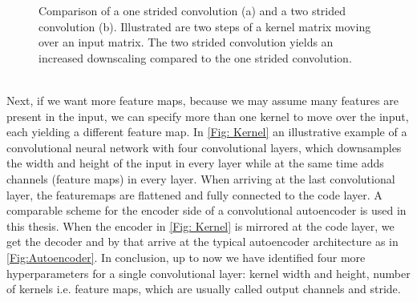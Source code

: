 \begin{figure}[htbp!]
	\begin{subfigure}{.459\textwidth}
		\centering
		
	\end{subfigure}\hfill
	\begin{subfigure}{.441\textwidth}
		\centering
		
	\end{subfigure}
	\caption{Comparison of a one strided convolution (a) and a two strided convolution (b). Illustrated are two steps of a kernel matrix moving over an input matrix. The two strided convolution yields an increased downscaling compared to the one strided convolution.}
	\label{Fig: Downsampling}
\end{figure}
\\Next, if we want more feature maps, because we may assume many features are present in the input, we can specify more than one kernel to move over the input, each yielding a different feature map. In \cref{Fig: Kernel} an illustrative example of a convolutional neural network with four convolutional layers, which downsamples the width and height of the input in every layer while at the same time adds channels (feature maps) in every layer. When arriving at the last convolutional layer, the featuremaps are flattened and fully connected to the code layer. A comparable scheme for the encoder side of a convolutional autoencoder is used in this thesis. When the encoder in \cref{Fig: Kernel} is mirrored at the code layer, we get the decoder and by that arrive at the typical autoencoder architecture as in \cref{Fig:Autoencoder}. In conclusion, up to now we have identified four more hyperparameters for a single convolutional layer: kernel width and height, number of kernels i.e. feature maps, which are usually called output channels and stride.\\
